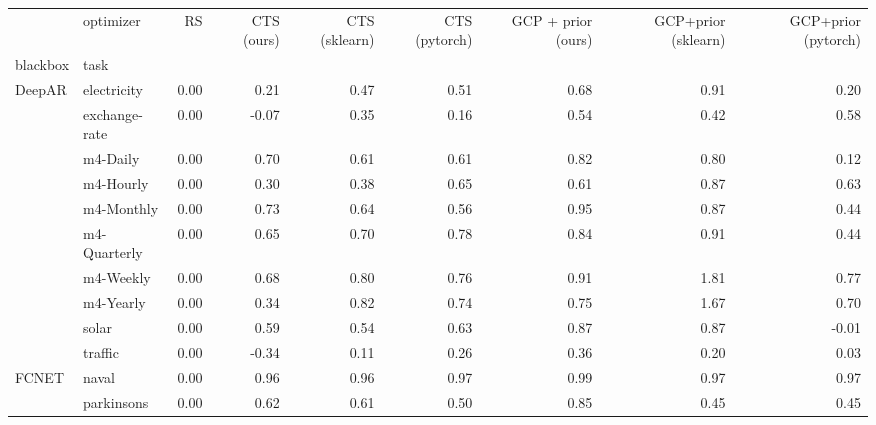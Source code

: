 \begin{tabular}{llrrrrrrr}
\toprule
             & optimizer &   RS &  CTS (ours) &  CTS (sklearn) &  CTS (pytorch) &  GCP + prior (ours) &  GCP+prior (sklearn) &  GCP+prior (pytorch) \\
blackbox & task &      &             &                &                &                     &                      &                      \\
\midrule
DeepAR & electricity & 0.00 &        0.21 &           0.47 &           0.51 &                0.68 &                 0.91 &                 0.20 \\
             & exchange-rate & 0.00 &       -0.07 &           0.35 &           0.16 &                0.54 &                 0.42 &                 0.58 \\
             & m4-Daily & 0.00 &        0.70 &           0.61 &           0.61 &                0.82 &                 0.80 &                 0.12 \\
             & m4-Hourly & 0.00 &        0.30 &           0.38 &           0.65 &                0.61 &                 0.87 &                 0.63 \\
             & m4-Monthly & 0.00 &        0.73 &           0.64 &           0.56 &                0.95 &                 0.87 &                 0.44 \\
             & m4-Quarterly & 0.00 &        0.65 &           0.70 &           0.78 &                0.84 &                 0.91 &                 0.44 \\
             & m4-Weekly & 0.00 &        0.68 &           0.80 &           0.76 &                0.91 &                 1.81 &                 0.77 \\
             & m4-Yearly & 0.00 &        0.34 &           0.82 &           0.74 &                0.75 &                 1.67 &                 0.70 \\
             & solar & 0.00 &        0.59 &           0.54 &           0.63 &                0.87 &                 0.87 &                -0.01 \\
             & traffic & 0.00 &       -0.34 &           0.11 &           0.26 &                0.36 &                 0.20 &                 0.03 \\
FCNET & naval & 0.00 &        0.96 &           0.96 &           0.97 &                0.99 &                 0.97 &                 0.97 \\
             & parkinsons & 0.00 &        0.62 &           0.61 &           0.50 &                0.85 &                 0.45 &                 0.45 \\

\end{tabular}
